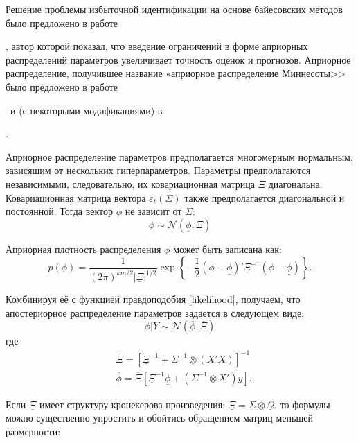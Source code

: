 \documentclass[11pt]{article} %
\newcommand{\cN}{\mathcal{N}}
\newcommand{\prior}{\underline}
\newcommand{\post}{\overline}
\newcommand{\eng}[1]{\begin{otherlanguage}{english}#1\end{otherlanguage}}
\begin{document}
Решение проблемы избыточной идентификации на основе байесовских методов было предложено в работе \eng{\cite{litterman_1979}}, автор которой показал, что введение ограничений в форме априорных распределений параметров увеличивает точность оценок и прогнозов. Априорное распределение, получившее название «априорное распределение Миннесоты>> было предложено в работе  \eng{\cite{litterman_1986}}~и (с некоторыми модификациями) в \eng{\cite{doan_al_1984}}.



Априорное распределение параметров предполагается многомерным нормальным, зависящим от нескольких гиперпараметров. Параметры предполагаются независимыми, следовательно, их ковариационная матрица $\Xi$ диагональна. Ковариационная матрица вектора $\varepsilon_t (\Sigma)$  также предполагается диагональной и постоянной.
Тогда вектор $\phi$ не зависит от $\Sigma$:
\begin{equation}
\phi\sim \cN(\prior \phi, \prior \Xi)
\end{equation}

Априорная плотность распределения $\phi$  может быть записана как:
\begin{equation}
p(\phi)=\frac{1}{(2\pi)^{km/2}|\prior\Xi|^{1/2}} \exp \left\lbrace-\frac{1}{2}(\phi-\prior \phi)'\prior\Xi^{-1}(\phi-\prior \phi ) \right\rbrace.
\end{equation}

Комбинируя её с функцией правдоподобия \eqref{likelihood}, получаем, что апостериорное распределение параметров задается в следующем виде:
\begin{equation}
\phi|Y\sim \cN(\post{\phi},\post \Xi)
\end{equation}
где
\begin{align*}
&\post \Xi=[\prior \Xi^{-1}+\Sigma^{-1}\otimes(X'X)]^{-1}\\
& \post \phi=\post{\Xi}[\prior \Xi^{-1}\prior \phi+(\Sigma^{-1}\otimes X')y].
\end{align*}

Если $\prior\Xi$ имеет структуру кронекерова произведения: $\prior\Xi = \Sigma \otimes \prior{\Omega}$, то формулы можно существенно упростить и обойтись обращением матриц меньшей размерности:
\end{document}
